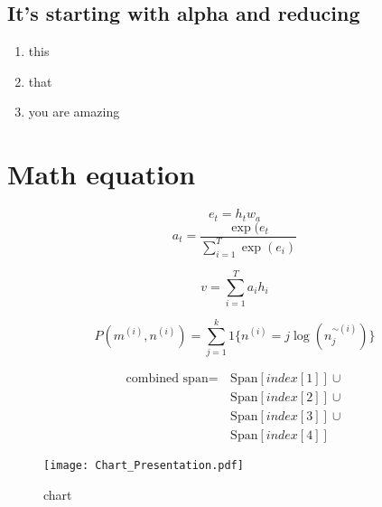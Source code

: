 \documentclass[]{article}
\begin{document}
\subsection{It's starting with alpha and reducing}
\begin{enumerate}[A]
\item this
\item that
\item you are amazing
\end{enumerate}

\section{Math equation}
\begin{equation}
e_{t}=h_{t}w_{a}
\label{eqn:sampleEquation}
\end{equation}
\begin{equation}
a_{t}=\frac{\exp(e_{t}}{\sum^{T}_{i=1}\exp(e_{i})}
\end{equation}

\begin{equation}
v=\sum^{T}_{i=1}a_{i}h_{i}
\end{equation}

\begin{equation}
P(m^{(i)}, n^{(i)}) = \sum_{j=1}^{k} 1\{ n^{(i)} = j \log(n_{j}^{\sim(i)}) \}
\end{equation}


\begin{equation}
\begin{split}
\mbox{combined span} = & \, \text{Span}[index[1]] \cup \\
                       & \, \text{Span}[index[2]] \cup \\
                       & \, \text{Span}[index[3]] \cup \\
                       & \, \text{Span}[index[4]]
\end{split}
\end{equation}
\begin{figure}[!h]
\centering
\texttt{[image: Chart\_Presentation.pdf]}
\caption{chart}
\end{figure}
\end{document}
